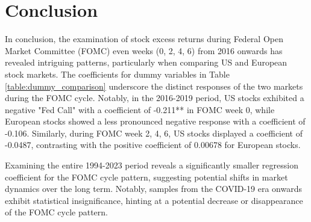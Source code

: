 



%

\chapter{Conclusion}
In conclusion, the examination of stock excess returns during Federal Open Market Committee (FOMC) even weeks (0, 2, 4, 6) from 2016 onwards has revealed intriguing patterns, particularly when comparing US and European stock markets. The coefficients for dummy variables in Table \ref{table:dummy_comparison} underscore the distinct responses of the two markets during the FOMC cycle. Notably, in the 2016-2019 period, US stocks exhibited a negative "Fed Call" with a coefficient of -0.211** in FOMC week 0, while European stocks showed a less pronounced negative response with a coefficient of -0.106. Similarly, during FOMC week 2, 4, 6, US stocks displayed a coefficient of -0.0487, contrasting with the positive coefficient of 0.00678 for European stocks.

Examining the entire 1994-2023 period reveals a significantly smaller regression coefficient for the FOMC cycle pattern, suggesting potential shifts in market dynamics over the long term. Notably, samples from the COVID-19 era onwards exhibit statistical insignificance, hinting at a potential decrease or disappearance of the FOMC cycle pattern.


